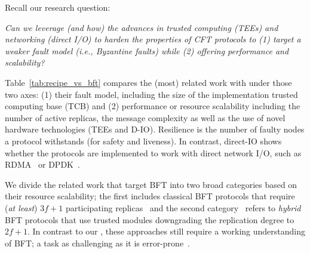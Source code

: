 Recall our research question:

\begin{tcolorbox}[colback=white, colframe=white, boxrule=0.1mm]
\emph{Can we leverage (and how) the advances in trusted computing (TEEs) and networking (direct I/O) to harden the properties of CFT protocols to (1) target a weaker fault model (i.e., Byzantine faults) while (2) offering performance and scalability? }
\end{tcolorbox}


Table~\ref{tab:recipe_vs_bft} compares the (most) related work with \projecttitle{} under those two axes: (1) their fault model, including the size of the implementation trusted computing base (TCB) and (2) performance or resource scalability including the number of active replicas, the message complexity as well as the use of novel hardware technologies (TEEs and D-IO). Resilience is the number of faulty nodes a protocol withstands (for safety and liveness). In contrast, direct-IO shows whether the protocols are implemented to work with direct network I/O, such as RDMA~\cite{rdma} or DPDK~\cite{dpdk}. 

We divide the related work that target BFT into two broad categories based on their resource scalability; the first includes classical BFT protocols that require (\emph{at least}) $3f+1$ participating replicas~\cite{DBLP:journals/corr/abs-1803-05069, bft-smart, Suri_Payer_2021, 10.1145/1658357.1658358, 6681599, all_about_eve} and the second category~\cite{10.1145/3552326.3587455, minBFT, hybster, DBLP:journals/corr/LiuLKA16a, A2M, 10.1145/2168836.2168866} refers to \emph{hybrid} BFT protocols that use trusted modules downgrading the replication degree to $2f+1$. In contrast to our \projecttitle{}, these approaches still require a working understanding of BFT; a task as challenging as it is error-prone~\cite{unsafeZyzzyva}.

